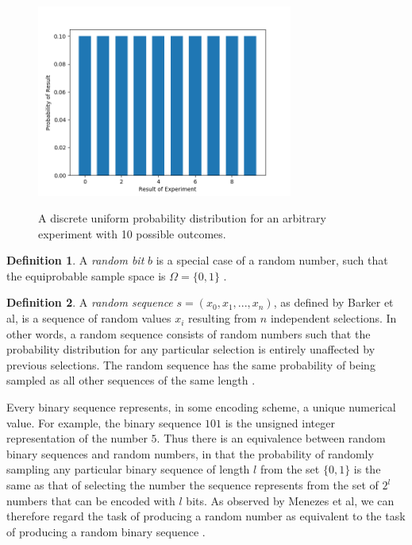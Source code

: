 \documentclass[12pt, titlepage]{report}
\theoremstyle{definition}
\newtheorem{definition}{Definition}
\begin{document}
\begin{figure}
\centering
\includegraphics[width=0.75\textwidth]{img/uniform.png}\\
\caption{A discrete uniform probability distribution for an arbitrary experiment with 10 possible outcomes.}
\label{figure:uniform_distribution}
\end{figure}

\begin{definition}
A \emph{random bit} $b$ is a special case of a random number, such that the equiprobable sample space is $\Omega = \{0, 1\}$ \cite[s. 1.1.1]{rukhin2001statistical}.
\end{definition}

\begin{definition}
A \emph{random sequence} $s = (x_0, x_1, ..., x_n)$, as defined by Barker et al, is a sequence of random values $x_i$ resulting from $n$ independent selections. In other words, a random sequence consists of random numbers such that the probability distribution for any particular selection is entirely unaffected by previous selections. The random sequence has the same probability of being sampled as all other sequences of the same length \cite[p. 7]{barker2007recommendation} \cite[s. 1.1.1]{rukhin2001statistical}.
\end{definition}

Every binary sequence represents, in some encoding scheme, a unique numerical value. For example, the binary sequence $101$ is the unsigned integer representation of the number $5$. Thus there is an equivalence between random binary sequences and random numbers, in that the probability of randomly sampling any particular binary sequence of length $l$ from the set $\{0, 1\}$ is the same as that of selecting the number the sequence represents from the set of $2^l$ numbers that can be encoded with $l$ bits. As observed by Menezes et al, we can therefore regard the task of producing a random number as equivalent to the task of producing a random binary sequence \cite[p. 170]{menezes1996handbook}.
\end{document}
